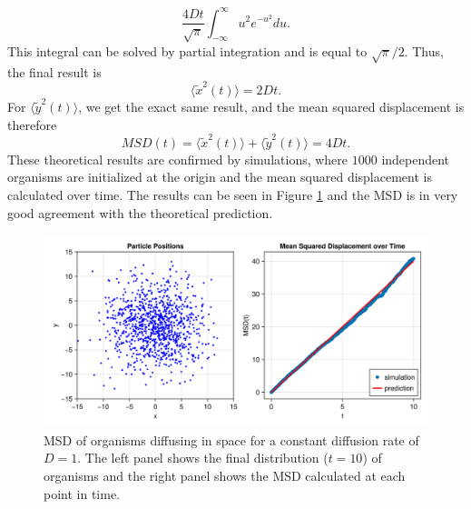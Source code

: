 \documentclass{article}
\begin{document}
\begin{equation*}
    \frac{4Dt}{\sqrt{\pi}}\int_{-\infty}^{\infty} u^2  e^{-u^2}du.
\end{equation*}
This integral can be solved by partial integration and is equal to $\sqrt{\pi}/2$.
Thus, the final result is 
\begin{equation*}
    \langle \tilde{x}^2(t)\rangle = 2Dt.
\end{equation*}
For $\langle \tilde{y}^2(t)\rangle$, we get the exact same result, and the mean squared displacement is therefore
\begin{equation*}
    MSD(t) = \langle \tilde{x}^2(t)\rangle + \langle \tilde{y}^2(t)\rangle  = 4Dt.
\end{equation*}
These theoretical results are confirmed by simulations, where $1000$ independent organisms are initialized at the origin and the mean squared displacement is calculated over time.
The results can be seen in Figure \ref{regular_diffusion} and the MSD is in very good agreement with the theoretical prediction. 

\begin{figure}
    \includegraphics[width=1.0\linewidth]{img/diffusion36.png}
    \caption{MSD of organisms diffusing in space for a constant diffusion rate of $D=1$. The left panel shows the final distribution ($t=10$) of organisms and the right panel shows the MSD calculated at each point in time.}
    \label{regular_diffusion}
\end{figure}
\end{document}
